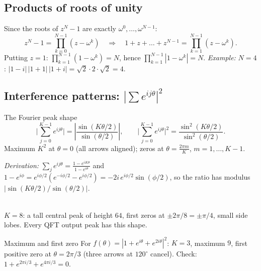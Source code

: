 \documentclass[11pt,a4paper,openany]{book}
\newcounter{wex}[chapter]
\begin{document}
\subsection{Products of roots of unity}
Since the roots of $z^N - 1$ are exactly $\omega^0, \dots, \omega^{N-1}$:
\[ z^N - 1 = \prod_{k=0}^{N-1}(z - \omega^k) \quad\Longrightarrow\quad 1 + z + \dots + z^{N-1} = \prod_{k=1}^{N-1}(z - \omega^k). \]
Putting $z = 1$: $\prod_{k=1}^{N-1}(1 - \omega^k) = N$, hence $\prod_{k=1}^{N-1}|1 - \omega^k| = N$.
\emph{Example:} $N = 4$: $|1 - i|\,|1 + 1|\,|1 + i| = \sqrt2\cdot2\cdot\sqrt2 = 4$. \checkmark

\subsection{Interference patterns: $|\sum e^{ij\theta}|^2$}
\begin{keyres}{The Fourier peak shape}
\[ \Big|\sum_{j=0}^{K-1} e^{ij\theta}\Big| = \left|\frac{\sin(K\theta/2)}{\sin(\theta/2)}\right|, \qquad
   \Big|\sum_{j=0}^{K-1} e^{ij\theta}\Big|^2 = \frac{\sin^2(K\theta/2)}{\sin^2(\theta/2)}. \]
Maximum $K^2$ at $\theta = 0$ (all arrows aligned); zeros at $\theta = \frac{2\pi m}{K}$, $m = 1, \dots, K-1$.
\end{keyres}
\emph{Derivation:} $\sum_j e^{ij\theta} = \frac{1 - e^{iK\theta}}{1 - e^{i\theta}}$ and $1 - e^{i\phi} = e^{i\phi/2}(e^{-i\phi/2} - e^{i\phi/2}) = -2i\,e^{i\phi/2}\sin(\phi/2)$,
so the ratio has modulus $|\sin(K\theta/2)/\sin(\theta/2)|$.

\begin{center}
\\
{\small $K = 8$: a tall central peak of height $64$, first zeros at $\pm 2\pi/8 = \pm\pi/4$, small side lobes. Every QFT
output peak has this shape.}
\end{center}

\begin{wexample}{Maximum and first zero}
For $f(\theta) = |1 + e^{i\theta} + e^{2i\theta}|^2$: $K = 3$, maximum $9$, first positive zero at $\theta = 2\pi/3$ (three arrows at
$120^\circ$ cancel). Check: $1 + e^{2\pi i/3} + e^{4\pi i/3} = 0$. \checkmark
\end{wexample}
\end{document}
